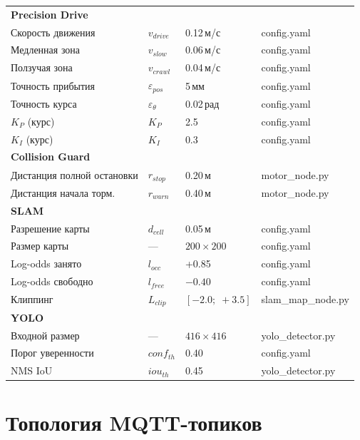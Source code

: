 \documentclass[12pt, a4paper]{article}
\begin{document}
\begin{longtable}{p{4.5cm} p{3.5cm} p{2.5cm} p{3cm}}
\midrule
\multicolumn{4}{l}{\textbf{Precision Drive}} \\
Скорость движения & $v_{drive}$ & 0.12\,м/с & config.yaml \\
Медленная зона & $v_{slow}$ & 0.06\,м/с & config.yaml \\
Ползучая зона & $v_{crawl}$ & 0.04\,м/с & config.yaml \\
Точность прибытия & $\varepsilon_{pos}$ & 5\,мм & config.yaml \\
Точность курса & $\varepsilon_\theta$ & 0.02\,рад & config.yaml \\
$K_P$ (курс) & $K_P$ & 2.5 & config.yaml \\
$K_I$ (курс) & $K_I$ & 0.3 & config.yaml \\
\midrule
\multicolumn{4}{l}{\textbf{Collision Guard}} \\
Дистанция полной остановки & $r_{stop}$ & 0.20\,м & motor\_node.py \\
Дистанция начала торм. & $r_{warn}$ & 0.40\,м & motor\_node.py \\
\midrule
\multicolumn{4}{l}{\textbf{SLAM}} \\
Разрешение карты & $d_{cell}$ & 0.05\,м & config.yaml \\
Размер карты & — & $200\times200$ & config.yaml \\
Log-odds занято & $l_{occ}$ & +0.85 & config.yaml \\
Log-odds свободно & $l_{free}$ & $-0.40$ & config.yaml \\
Клиппинг & $L_{clip}$ & $[-2.0;\;+3.5]$ & slam\_map\_node.py \\
\midrule
\multicolumn{4}{l}{\textbf{YOLO}} \\
Входной размер & — & $416\times416$ & yolo\_detector.py \\
Порог уверенности & $conf_{th}$ & 0.40 & config.yaml \\
NMS IoU & $iou_{th}$ & 0.45 & yolo\_detector.py \\
\end{longtable}

\newpage
\section{Топология MQTT-топиков}
\label{sec:mqtt}
\end{document}
